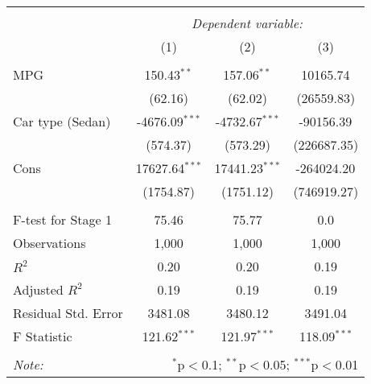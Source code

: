 \begin{table}[!htbp] \centering
\begin{tabular}{@{\extracolsep{5pt}}lccc}
\\[-1.8ex]\hline
\hline \\[-1.8ex]
& \multicolumn{3}{c}{\textit{Dependent variable:}} \
\cr \cline{3-4}
\\[-1.8ex] & (1) & (2) & (3) \\
\hline \\[-1.8ex]
 MPG & 150.43$^{**}$ & 157.06$^{**}$ & 10165.74$^{}$ \\
  & (62.16) & (62.02) & (26559.83) \\
 Car type (Sedan) & -4676.09$^{***}$ & -4732.67$^{***}$ & -90156.39$^{}$ \\
  & (574.37) & (573.29) & (226687.35) \\
 Cons & 17627.64$^{***}$ & 17441.23$^{***}$ & -264024.20$^{}$ \\
  & (1754.87) & (1751.12) & (746919.27) \\
\hline \\[-1.8ex]
 F-test for Stage 1 & 75.46 & 75.77 & 0.0 \\
 Observations & 1,000 & 1,000 & 1,000 \\
 $R^2$ & 0.20 & 0.20 & 0.19 \\
 Adjusted $R^2$ & 0.19 & 0.19 & 0.19 \\
 Residual Std. Error & 3481.08 & 3480.12 & 3491.04  \\
 F Statistic & 121.62$^{***}$  & 121.97$^{***}$  & 118.09$^{***}$  \\
\hline
\hline \\[-1.8ex]
\textit{Note:} & \multicolumn{3}{r}{$^{*}$p$<$0.1; $^{**}$p$<$0.05; $^{***}$p$<$0.01} \\
\end{tabular}
\end{table}